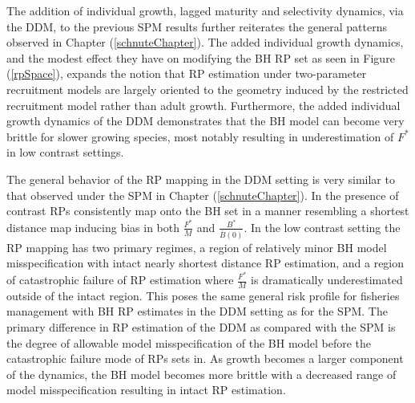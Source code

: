%
The addition of individual growth, lagged maturity and selectivity dynamics, via the DDM, to the 
previous SPM results %
further reiterates the general patterns observed in Chapter (\ref{schnuteChapter}). 
The added individual growth dynamics, and the modest effect they have on modifying the BH RP set as seen 
in Figure (\ref{rpSpace}), expands the notion that RP estimation under %
two-parameter recruitment models are largely oriented to the geometry induced by the 
restricted recruitment model rather than adult growth. Furthermore, the added individual 
growth dynamics of the DDM demonstrates that the BH model can become very brittle 
for slower growing species, most notably resulting in underestimation of $F^*$ in low contrast settings.


%
The general behavior of the RP mapping in the DDM setting is very similar to 
that observed under the SPM in Chapter (\ref{schnuteChapter}). In the presence of contrast 
RPs consistently map onto the BH set in a manner resembling a shortest distance map inducing bias in both $\frac{F^*}{M}$ and $\frac{B^*}{\bar B(0)}$.
In the low contrast setting the RP mapping has two primary regimes, a region of relatively 
minor BH model misspecification with intact nearly shortest distance RP estimation, and a region of %
catastrophic failure of RP estimation where $\frac{F^*}{M}$ is dramatically underestimated 
outside of the intact region. This poses the same general risk profile for fisheries 
management with BH RP estimates in the DDM setting as for the SPM. The primary difference 
in RP estimation of the DDM as compared with the SPM is the degree of allowable model 
misspecification of the BH model before the catastrophic failure mode of RPs sets in. 
As growth becomes a larger component of the dynamics, the BH model becomes more brittle 
with a decreased range of model misspecification resulting in intact RP estimation.
 
